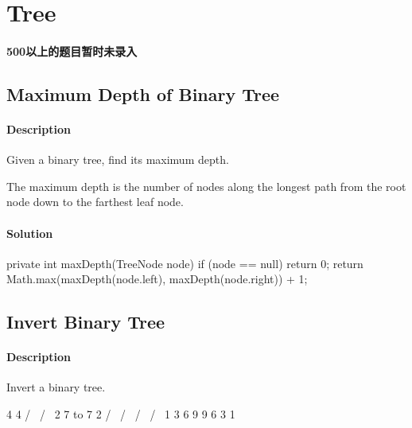 \chapter{Tree}

\subsubsection{500以上的题目暂时未录入}

\section{Maximum Depth of Binary Tree} %

\subsubsection{Description}

Given a binary tree, find its maximum depth.

The maximum depth is the number of nodes along the longest path from the root node down to the farthest leaf node.

\subsubsection{Solution}

\begin{Code}
private int maxDepth(TreeNode node) {
    if (node == null) {
        return 0;
    }
    return Math.max(maxDepth(node.left), maxDepth(node.right)) + 1;
}
\end{Code}

\newpage

\section{Invert Binary Tree} %

\subsubsection{Description}

Invert a binary tree.
\begin{Code}
     4                              4
   /   \                          /   \
  2     7           to           7     2
 / \   / \                      / \   / \
1   3 6   9                    9   6 3   1
\end{Code}

